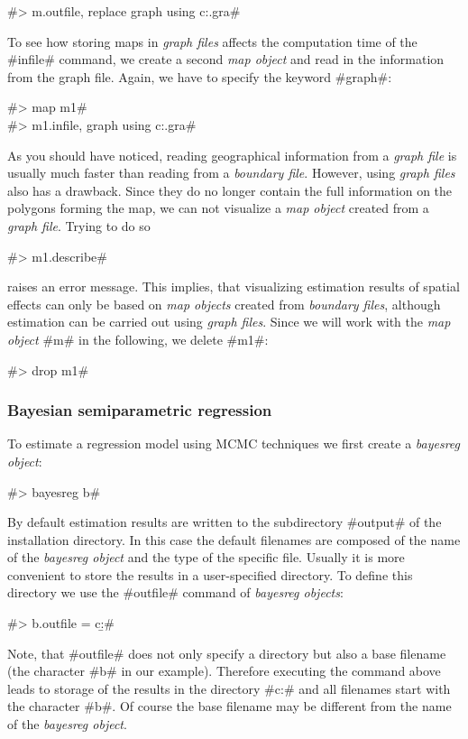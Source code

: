 #> m.outfile, replace graph using c:\data\zambiasort.gra#

To see how storing maps in {\it graph files} affects the
computation time of the #infile# command, we create a second {\it
map object} and read in the information from the graph file.
Again, we have to specify the keyword #graph#:

#> map m1#\\
#> m1.infile, graph using c:\data\zambiasort.gra#

As you should have noticed, reading geographical information from
a {\it graph file} is usually much faster than reading from a {\it
boundary file}. However, using {\it graph files} also has a
drawback. Since they do no longer contain the full information on
the polygons forming the map, we can not visualize a {\it map
object} created from a {\it graph file}. Trying to do so

#> m1.describe#

raises an error message. This implies, that visualizing estimation
results of spatial effects can only be based on {\it map objects}
created from {\it boundary files}, although estimation can be
carried out using {\it graph files}. Since we will work with the
{\it map object} #m# in the following, we delete #m1#:

#> drop m1#

\subsubsection{Bayesian semiparametric
regression}\label{zambia_mcmc_regression}

To estimate a regression model using MCMC techniques we first
create a {\it bayesreg object}:

#> bayesreg b#

By default estimation results are written to the subdirectory
#output# of the installation directory. In this case the default
filenames are composed of the name of the {\it bayesreg object}
and the type of the specific file. Usually it is more convenient
to store the results in a user-specified directory. To define this
directory we use the #outfile# command of {\it bayesreg objects}:

#> b.outfile = c:\data\b#

Note, that #outfile# does not only specify a directory but also a
base filename (the character #b# in our example). Therefore
executing the command above leads to storage of the results in the
directory #c:\data# and all filenames start with the character
#b#. Of course the base filename may be different from the name of
the {\it bayesreg object}.

